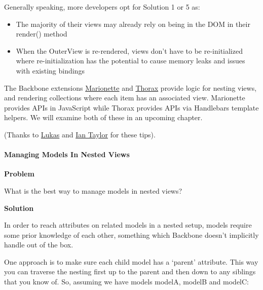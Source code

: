 \documentclass[9pt]{book}
\begin{document}
Generally speaking, more developers opt for Solution 1 or 5 as:

\begin{itemize}
\itemsep1pt\parskip0pt
\item
  The majority of their views may already rely on being in the DOM in
  their render() method
\item
  When the OuterView is re-rendered, views don't have to be
  re-initialized where re-initialization has the potential to cause
  memory leaks and issues with existing bindings
\end{itemize}

The Backbone extensions
\hyperref[marionettejs-backbone.marionette]{Marionette} and
\hyperref[thorax]{Thorax} provide logic for nesting views, and rendering
collections where each item has an associated view. Marionette provides
APIs in JavaScript while Thorax provides APIs via Handlebars template
helpers. We will examine both of these in an upcoming chapter.

(Thanks to \href{http://stackoverflow.com/users/299189/lukas}{Lukas} and
\href{http://stackoverflow.com/users/154765/ian-storm-taylor}{Ian
Taylor} for these tips).

\paragraph{Managing Models In Nested
Views}\label{managing-models-in-nested-views}

\textbf{Problem}

What is the best way to manage models in nested views?

\textbf{Solution}

In order to reach attributes on related models in a nested setup, models
require some prior knowledge of each other, something which Backbone
doesn't implicitly handle out of the box.

One approach is to make sure each child model has a `parent' attribute.
This way you can traverse the nesting first up to the parent and then
down to any siblings that you know of. So, assuming we have models
modelA, modelB and modelC:
\end{document}
